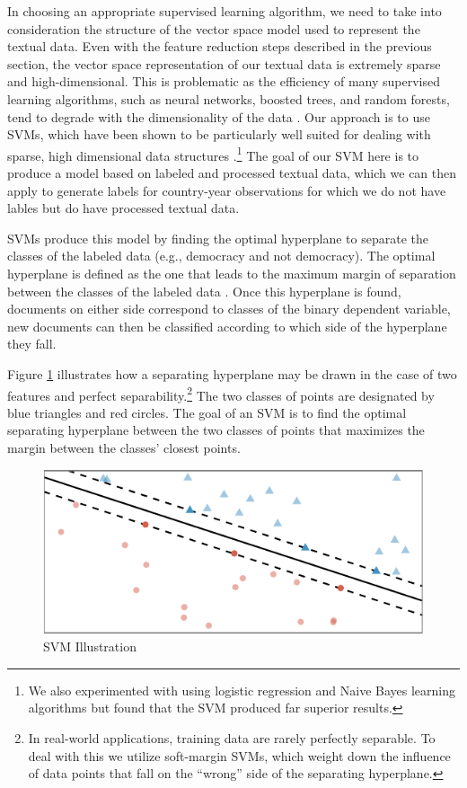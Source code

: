 \documentclass[pdftex,12pt,fullpage,oneside]{amsart}
\begin{document}
In choosing an appropriate supervised learning algorithm, we need to take into consideration the structure of the vector space model used to represent the textual data. Even with the feature reduction steps described in the previous section, the vector space representation of our textual data is extremely sparse and high-dimensional. This is problematic as the efficiency of many supervised learning algorithms, such as neural networks, boosted trees, and random forests, tend to degrade with the dimensionality of the data \citep{caruana2008empirical}. Our approach is to use SVMs, which have been shown to be particularly well suited for dealing with sparse, high dimensional data structures \citep{joachims1998text,dorazio:etal:2014}.\footnote{We also experimented with using logistic regression and Naive Bayes learning algorithms but found that the SVM produced far superior results.} The goal of our SVM here is to produce a model based on labeled and processed textual data, which we can then apply to generate labels for country-year observations for which we do not have lables but do have processed textual data. 

SVMs produce this model by finding the optimal hyperplane to separate the classes of the labeled data (e.g., democracy and not democracy). The optimal hyperplane is defined as the one that leads to the maximum margin of separation between the classes of the labeled data \citep{vapnik2000nature,chang2011libsvm}. Once this hyperplane is found, documents on either side correspond to classes of the binary dependent variable, new documents can then be classified according to which side of the hyperplane they fall. 

Figure \ref{fig:svmIntro} illustrates how a separating hyperplane may be drawn in the case of two features and perfect separability.\footnote{In real-world applications, training data are rarely perfectly separable. To deal with this we utilize soft-margin SVMs, which weight down the influence of data points that fall on the ``wrong'' side of the separating hyperplane.} The two classes of points are designated by blue triangles and red circles. The goal of an SVM is to find the optimal separating hyperplane between the two classes of points that maximizes the margin between the classes' closest points. 

\begin{figure}[ht]
	\centering
	\includegraphics[width=.7\textwidth]{svmIntro}
	\caption{SVM Illustration}
	\label{fig:svmIntro}
\end{figure}
\FloatBarrier
\end{document}
